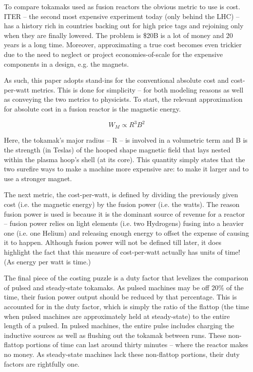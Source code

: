 \documentclass[11pt]{book}
\begin{document}
To compare tokamaks used as fusion reactors the obvious metric to use is cost. ITER -- the second most expensive experiment today (only behind the LHC) -- has a history rich in countries backing out for high price tags and rejoining only when they are finally lowered. The problem is \$20B is a lot of money and 20 years is a long time. Moreover, approximating a true cost becomes even trickier due to the need to neglect or project economies-of-scale for the expensive components in a design, e.g. the magnets.

As such, this paper adopts stand-ins for the conventional absolute cost and cost-per-watt metrics. This is done for simplicity -- for both modeling reasons as well as conveying the two metrics to physicists. To start, the relevant approximation for absolute cost in a fusion reactor is the magnetic energy.

\begin{equation}
	W_M \propto R^3 B^2
\end{equation}

Here, the tokamak's major radius -- R -- is involved in a volumetric term and B is the strength (in Teslas) of the hooped shape magnetic field that lays nested within the plasma hoop's shell (at its core). This quantity simply states that the two surefire ways to make a machine more expensive are: to make it larger and to use a stronger magnet.

The next metric, the cost-per-watt, is defined by dividing the previously given cost (i.e. the magnetic energy) by the fusion power (i.e. the watts). The reason fusion power is used is because it is the dominant source of revenue for a reactor -- fusion power relies on light elements (i.e. two Hydrogens) fusing into a heavier one (i.e. one Helium) and releasing enough energy to offset the expense of causing it to happen. Although fusion power will not be defined till later, it does highlight the fact that this measure of cost-per-watt actually has units of time! (As energy per watt is time.)

The final piece of the costing puzzle is a duty factor that levelizes the comparison of pulsed and steady-state tokamaks. As pulsed machines may be off 20\% of the time, their fusion power output should be reduced by that percentage. This is accounted for in the duty factor, which is simply the ratio of the flattop (the time when pulsed machines are approximately held at steady-state) to the entire length of a pulsed. In pulsed machines, the entire pulse includes charging the inductive sources as well as flushing out the tokamak between runs. These non-flattop portions of time can last around thirty minutes -- where the reactor makes no money. As steady-state machines lack these non-flattop portions, their duty factors are rightfully one.
\end{document}
